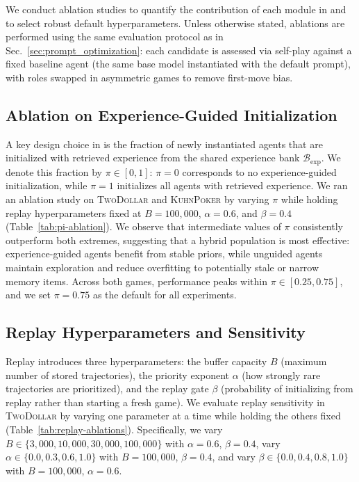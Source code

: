We conduct ablation studies to quantify the contribution of each module in \NAME{} and to select robust default hyperparameters. Unless otherwise stated, ablations are performed using the same evaluation protocol as in Sec.~\ref{sec:prompt_optimization}: each candidate is assessed via self-play against a fixed baseline agent (the same base model instantiated with the default prompt), with roles swapped in asymmetric games to remove first-move bias.

\subsection{Ablation on Experience-Guided Initialization}
\label{appendix:ablation-experience}
A key design choice in \NAME{} is the fraction of newly instantiated agents that are initialized with retrieved experience from the shared experience bank $\mathcal{B}_{\text{exp}}$. We denote this fraction by $\pi \in [0,1]$: $\pi=0$ corresponds to no experience-guided initialization, while $\pi=1$ initializes all agents with retrieved experience. We ran an ablation study on \textsc{TwoDollar} and \textsc{KuhnPoker} by varying $\pi$ while holding replay hyperparameters fixed at $B=100{,}000$, $\alpha=0.6$, and $\beta=0.4$ (Table~\ref{tab:pi-ablation}). We observe that intermediate values of $\pi$ consistently outperform both extremes, suggesting that a hybrid population is most effective: experience-guided agents benefit from stable priors, while unguided agents maintain exploration and reduce overfitting to potentially stale or narrow memory items. Across both games, performance peaks within $\pi \in [0.25, 0.75]$, and we set $\pi=0.75$ as the default for all experiments.




\subsection{Replay Hyperparameters and Sensitivity}
\label{appendix:ablation-replay}
Replay introduces three hyperparameters: the buffer capacity $B$ (maximum number of stored trajectories), the priority exponent $\alpha$ (how strongly rare trajectories are prioritized), and the replay gate $\beta$ (probability of initializing from replay rather than starting a fresh game). We evaluate replay sensitivity in \textsc{TwoDollar} by varying one parameter at a time while holding the others fixed (Table~\ref{tab:replay-ablations}). Specifically, we vary $B \in \{3{,}000, 10{,}000, 30{,}000, 100{,}000\}$ with $\alpha=0.6$, $\beta=0.4$, vary $\alpha \in \{0.0, 0.3, 0.6, 1.0\}$ with $B=100{,}000$, $\beta=0.4$, and vary $\beta \in \{0.0, 0.4, 0.8, 1.0\}$ with $B=100{,}000$, $\alpha=0.6$.

